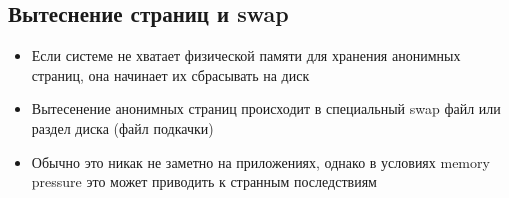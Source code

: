     \subsection{Вытеснение страниц и swap}
      \begin{itemize}
        \item Если системе не хватает физической памяти для хранения анонимных страниц, она начинает их сбрасывать на диск
        \item Вытесенение анонимных страниц происходит в специальный swap файл или раздел диска (файл подкачки)
        \item Обычно это никак не заметно на приложениях, однако в условиях memory pressure это может приводить к странным последствиям
      \end{itemize}